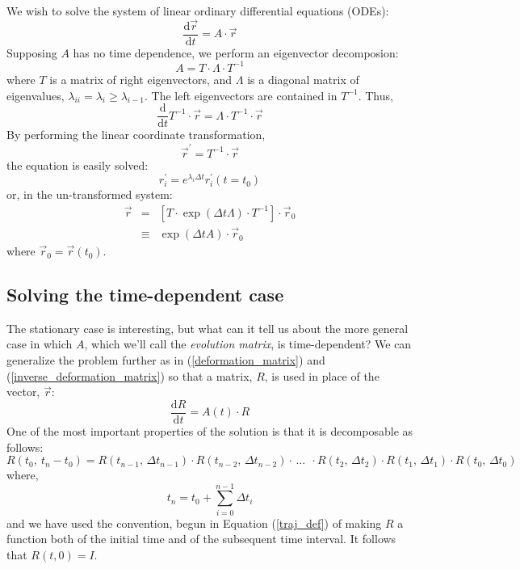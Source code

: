 \documentclass[11pt]{article}
\begin{document}
We wish to solve the system of linear ordinary differential equations (ODEs):
\begin{equation}
\frac{\mathrm d \vec r}{\mathrm d t}=A \cdot \vec r
\label{linear_ODE_system_vector_soln}
\end{equation}
Supposing $A$ has no time dependence, we perform an eigenvector 
decomposion:
\begin{equation}
  A = T \cdot \Lambda \cdot T^{-1}
  \label{eigenvalue_expansion}
\end{equation}
where $T$ is a matrix of right eigenvectors, and $\Lambda$ is a diagonal matrix
of eigenvalues, $\lambda_{ii}=\lambda_i \ge \lambda_{i-1}$.  
The left eigenvectors are contained in $T^{-1}$.
Thus,
\begin{equation}
  \frac{\mathrm d}{\mathrm d t} T^{-1} \cdot \vec r=\Lambda \cdot T^{-1} \cdot  \vec r
\end{equation}
By performing the linear coordinate transformation,
\begin{equation}
  \vec r^\prime=T^{-1} \cdot \vec r
\end{equation}
the equation is easily solved:
\begin{equation}
r^\prime_i = e^{\lambda_i \Delta t} r^\prime_i(t=t_0)
\end{equation}
or, in the un-transformed system:
\begin{eqnarray}
  \vec r & = & \left [T \cdot \exp(\Delta t \Lambda) \cdot T^{-1} \right ] \cdot \vec r_0 
\label{solution_no_time_dependence} \\
& \equiv & \exp(\Delta t A)\cdot \vec r_0
\end{eqnarray}
where $\vec r_0=\vec r(t_0)$.

\subsection{Solving the time-dependent case}

The stationary case is interesting, but what can it tell us about the 
more general case in which $A$, which we'll call the {\it evolution matrix},
is time-dependent?
We can generalize the problem further as in (\ref{deformation_matrix}) and
(\ref{inverse_deformation_matrix}) so that a matrix, $R$, 
is used in place of the vector, $\vec r$:
\begin{equation}
\frac{\mathrm d R}{\mathrm d t}=A(t) \cdot R
\label{linear_ODE_system_matrix_soln}
\end{equation}
One of the most important properties of the solution is that it
is decomposable as follows:
\begin{equation}
R(t_0,~t_n-t_0) = R(t_{n-1},\,\Delta t_{n-1}) \cdot R(t_{n-2},\,\Delta t_{n-2}) \cdot \, ...~~ 
	\cdot R(t_2,\, \Delta t_2) \cdot R(t_1,\,\Delta t_1) \cdot R(t_0,\,\Delta t_0)
\label{matrix_soln_decomposition}
\end{equation}
where,
\begin{equation}
t_n=t_0+\sum_{i=0}^{n-1} \Delta t_i
\end{equation}
and we have used the convention, begun
in Equation (\ref{traj_def}) of making $R$ a function both of the
initial time and of the subsequent time interval.  
It follows that $R(t, 0)=I$.
\end{document}
